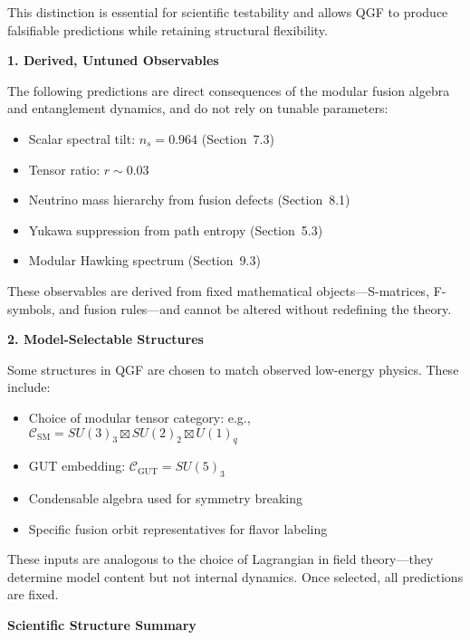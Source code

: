 \documentclass[11pt]{article}
\begin{document}
This distinction is essential for scientific testability and allows QGF to produce falsifiable predictions while retaining structural flexibility.

\vspace{0.5em}
\noindent\textbf{1. Derived, Untuned Observables}

The following predictions are direct consequences of the modular fusion algebra and entanglement dynamics, and do not rely on tunable parameters:

\begin{itemize}
  \item Scalar spectral tilt: \( n_s = 0.964 \) (Section~7.3)
  \item Tensor ratio: \( r \sim 0.03 \)
  \item Neutrino mass hierarchy from fusion defects (Section~8.1)
  \item Yukawa suppression from path entropy (Section~5.3)
  \item Modular Hawking spectrum (Section~9.3)
\end{itemize}

These observables are derived from fixed mathematical objects—S-matrices, F-symbols, and fusion rules—and cannot be altered without redefining the theory.

\vspace{0.5em}
\noindent\textbf{2. Model-Selectable Structures}

Some structures in QGF are chosen to match observed low-energy physics. These include:

\begin{itemize}
  \item Choice of modular tensor category: e.g., \( \mathcal{C}_{\text{SM}} = SU(3)_3 \boxtimes SU(2)_2 \boxtimes U(1)_q \)
  \item GUT embedding: \( \mathcal{C}_{\text{GUT}} = SU(5)_3 \)
  \item Condensable algebra used for symmetry breaking
  \item Specific fusion orbit representatives for flavor labeling
\end{itemize}

These inputs are analogous to the choice of Lagrangian in field theory—they determine model content but not internal dynamics. Once selected, all predictions are fixed.

\vspace{0.5em}
\noindent\textbf{Scientific Structure Summary}
\end{document}
